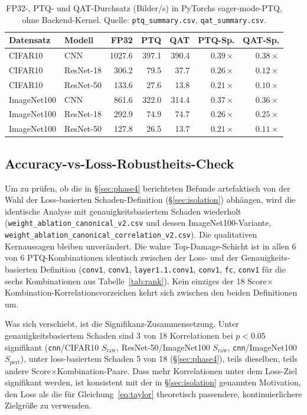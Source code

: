 \begin{table}[t]
\centering
\small
\caption{FP32-, PTQ- und QAT-Durchsatz (Bilder/s) in PyTorchs eager-mode-PTQ, ohne Backend-Kernel. Quelle: \texttt{ptq\_summary.csv}, \texttt{qat\_summary.csv}.}
\label{tab:eagerfps}
\begin{tabular}{llrrrrr}
\toprule
Datensatz & Modell & FP32 & PTQ & QAT & PTQ-Sp. & QAT-Sp. \\
\midrule
CIFAR10 & CNN & 1027.6 & 397.1 & 390.4 & $0.39\times$ & $0.38\times$ \\
CIFAR10 & ResNet-18 & 306.2 & 79.5 & 37.7 & $0.26\times$ & $0.12\times$ \\
CIFAR10 & ResNet-50 & 133.6 & 27.6 & 13.8 & $0.21\times$ & $0.10\times$ \\
ImageNet100 & CNN & 861.6 & 322.0 & 314.4 & $0.37\times$ & $0.36\times$ \\
ImageNet100 & ResNet-18 & 292.9 & 74.9 & 74.7 & $0.26\times$ & $0.25\times$ \\
ImageNet100 & ResNet-50 & 127.8 & 26.5 & 13.7 & $0.21\times$ & $0.11\times$ \\
\bottomrule
\end{tabular}
\end{table}

\subsection{Accuracy-vs-Loss-Robustheits-Check}
\label{sec:robustness}

Um zu prüfen, ob die in \S\ref{sec:phase4} berichteten Befunde artefaktisch von der Wahl der Loss-basierten Schaden-Definition (\S\ref{sec:isolation}) abhängen, wird die identische Analyse mit genauigkeitsbasiertem Schaden wiederholt (\texttt{weight\_ablation\_canonical\_v2.csv} und dessen ImageNet100-Variante, \texttt{weight\_ablation\_canonical\_correlation\_v2.csv}). Die qualitativen Kernaussagen bleiben unverändert. Die wahre Top-Damage-Schicht ist in allen 6 von 6 PTQ-Kombinationen identisch zwischen der Loss- und der Genauigkeits-basierten Definition (\texttt{conv1}, \texttt{conv1}, \texttt{layer1.1.conv1}, \texttt{conv1}, \texttt{fc}, \texttt{conv1} für die sechs Kombinationen aus Tabelle~\ref{tab:rank}). Kein einziges der 18 Score$\times$Kombination-Korrelationsvorzeichen kehrt sich zwischen den beiden Definitionen um.
\par\medskip

Was sich verschiebt, ist die Signifikanz-Zusammensetzung. Unter genauigkeitsbasiertem Schaden sind 3 von 18 Korrelationen bei $p<0.05$ signifikant (\texttt{cnn}/CIFAR10 $S_{\mathrm{raw}}$, ResNet-50/ImageNet100 $S_{\mathrm{raw}}$, \texttt{cnn}/ImageNet100 $S_{\mathrm{pert}}$), unter loss-basiertem Schaden 5 von 18 (\S\ref{sec:phase4}), teils dieselben, teils andere Score$\times$Kombination-Paare. Dass mehr Korrelationen unter dem Loss-Ziel signifikant werden, ist konsistent mit der in \S\ref{sec:isolation} genannten Motivation, den Loss als die für Gleichung~\eqref{eq:taylor} theoretisch passendere, kontinuierlichere Zielgröße zu verwenden.
\par\medskip

